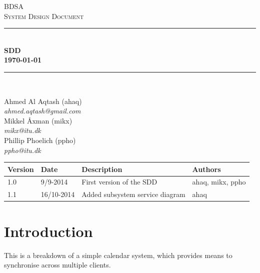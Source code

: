 \documentclass[10pt]{report}
\numberwithin{equation}{section} %
\numberwithin{figure}{section} %
\numberwithin{table}{section} %
\newcommand{\HRule}{\rule{\linewidth}{0.5mm}}
\begin{document}
\begin{titlepage}

\begin{center}

\textsc{\LARGE BDSA}\\[1.5cm]

\textsc{\Large System Design Document}\\[0.5cm]

\HRule \\[0.4cm]

{ \bfseries SDD \\[0.5cm] 
    {\small \today}} \\[0.7cm]

\HRule \\ [6.5cm]

\begin{minipage}{0.5\textwidth}
\begin{flushleft} \large
Ahmed Al Aqtash (ahaq)\\
\textit{ahmed.aqtash@gmail.com}\\
Mikkel Åxman (mikx)\\
\textit{mikx@itu.dk}\\
Phillip Phoelich (ppho)\\
\textit{ppho@itu.dk}\\

\vfill 
\end{flushleft}
\end{minipage}

\end{center}

\end{titlepage}
\clearpage
\begin{table}[h]
\begin{tabularx}{\textwidth}{l l X l}
\textbf{Version} & \textbf{Date} & \textbf{Description} & \textbf{Authors} \\ \midrule
1.0     & 9/9-2014 & First version of the SDD & ahaq, mikx, ppho \\
1.1     & 16/10-2014 & Added subsystem service diagram & ahaq\\
\end{tabularx}
\end{table}

\clearpage
\section{Introduction}
This is a breakdown of a simple calendar system, which provides means to
synchronise across multiple clients.
\end{document}
